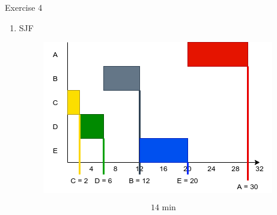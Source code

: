 \documentclass[10pt]{beamer}
\begin{document}
\begin{frame}{Exercise 4}
\begin{enumerate}
		 \item SJF \\ \vspace{0.7cm}
        \begin{minipage}{0.49\textwidth}
            \begin{figure}
                    \includegraphics[keepaspectratio, width=\textwidth, height=\textheight]{img/sjf.png} \\
                \end{figure}
        \end{minipage} \hfill \begin{minipage}{0.3\textwidth}
        \end{minipage} \vspace{0.7cm}
		 \alert{\[ 14\text{ min} \]}
	\end{enumerate}
\end{frame}
\end{document}
